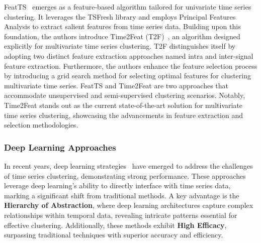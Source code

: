 FeatTS~\cite{tiano2021featts} emerges as a feature-based algorithm tailored for univariate time series clustering. It leverages the TSFresh library and employs Principal Features Analysis to extract salient features from time series data. 
Building upon this foundation, the authors introduce Time2Feat (T2F)~\cite{bonifati2022time2feat}, an algorithm designed explicitly for multivariate time series clustering. T2F distinguishes itself by adopting two distinct feature extraction approaches named intra and inter-signal feature extraction. 
Furthermore, the authors enhance the feature selection process by introducing a grid search method for selecting optimal features for clustering multivariate time series.
FeatTS and Time2Feat are two approaches that accommodate unsupervised and semi-supervised clustering scenarios. Notably, Time2Feat stands out as the current state-of-the-art solution for multivariate time series clustering, showcasing the advancements in feature extraction and selection methodologies.



\subsubsection{Deep Learning Approaches}

In recent years, deep learning strategies~\cite{alqahtani2021deep} have emerged to address the challenges of time series clustering, demonstrating strong performance. These approaches leverage deep learning's ability to directly interface with time series data, marking a significant shift from traditional methods. A key advantage is the \textbf{Hierarchy of Abstraction}, where deep learning architectures capture complex relationships within temporal data, revealing intricate patterns essential for effective clustering. Additionally, these methods exhibit \textbf{High Efficacy}, surpassing traditional techniques with superior accuracy and efficiency.

